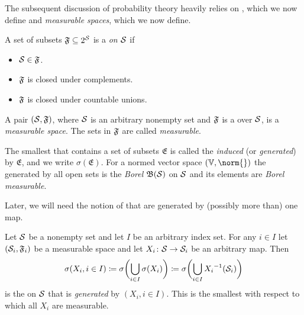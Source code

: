 The subsequent discussion of probability theory heavily relies on \SigmaAlgebras, which we now define and \emph{measurable spaces}, which we now define.
\begin{definition}[\SigmaAlgebra]%
	\label{def:sigma algebra}
	A set of subsets \( \mathfrak{F} \subseteq 2^{\mathcal{S}} \) is a \emph{\SigmaAlgebra{} on \( \mathcal{S} \)} if
	\begin{itemize}
		\item \( \mathcal{S} \in \mathfrak{F} \).
		\item \( \mathfrak{F} \) is closed under complements.
		\item \( \mathfrak{F} \) is closed under countable unions.
	\end{itemize}
\end{definition}
\begin{definition}%
	\label{def:measurable spaces and measureable sets}
	A pair \( (\mathcal{S}, \mathfrak{F}) \), where \( \mathcal{S} \) is an arbitrary nonempty set and \( \mathfrak{F} \) is a \SigmaAlgebra{} over \( \mathcal{S} \), is a \emph{measurable space}.
	The sets in \( \mathfrak{F} \) are called \emph{measurable}.
\end{definition}
The smallest \SigmaAlgebra{} that contains a set of subsets \( \mathfrak{E} \) is called the \SigmaAlgebra{} \emph{induced} (or \emph{generated}) by \( \mathfrak{E} \), and we write \( \sigma(\mathfrak{E}) \).
For a normed vector space \( (\V, \norm{}) \) the \SigmaAlgebra{} generated by all open sets is the \emph{Borel \SigmaAlgebra} \( \mathfrak{B}(\mathcal{S}) \) on \( \mathcal{S} \) and its elements are \emph{Borel measurable}.

Later, we will need the notion of \SigmaAlgebras{} that are generated by (possibly more than) one map.
\begin{definition}%
	\label{def:generated sigma algebra}
	Let \( \mathcal{S} \) be a nonempty set and let \( I \) be an arbitrary index set.
	For any \( i \in I \) let \( (\mathcal{S}_i, \mathfrak{F}_i) \) be a measurable space and let \( X_i \colon \mathcal{S} \to \mathcal{S}_i \) be an arbitrary map.
	Then
	\begin{equation}
		\sigma(X_i, i \in I) \coloneqq \sigma\biggl( \bigcup_{i \in I} \sigma(X_i) \biggr) \coloneqq \sigma\biggl( \bigcup_{i\in I} {X_i}^{-1}(\mathcal{S}_i) \biggr)
	\end{equation}
	is the \SigmaAlgebra{} on \( \mathcal{S} \) that is \emph{generated} by \( (X_i, i \in I) \).
	This is the smallest \SigmaAlgebra{} with respect to which all \( X_i \) are measurable.
\end{definition}

